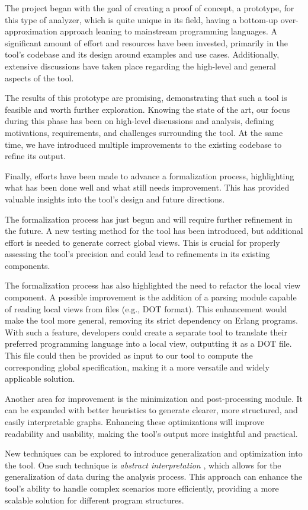 The project began with the goal of creating a proof of concept, a prototype,  
for this type of analyzer, which is quite unique in its field,
having a bottom-up over-approximation approach leaning to mainstream
programming languages.  
A significant amount of effort and resources have been invested,  
primarily in the tool's codebase and its design around examples and  
use cases. Additionally, extensive discussions have taken place  
regarding the high-level and general aspects of the tool.  

The results of this prototype are promising, demonstrating that such  
a tool is feasible and worth further exploration.  
Knowing the state of the art, our focus during this phase has been on  
high-level discussions and analysis, defining motivations,  
requirements, and challenges surrounding the tool. At the same time,  
we have introduced multiple improvements to the existing codebase to  
refine its output.  

Finally, efforts have been made to advance a formalization process,  
highlighting what has been done well and what still needs  
improvement. This has provided valuable insights into the tool’s  
design and future directions.  

The formalization process has just begun and will require further refinement  
in the future. A new testing method for the tool has been introduced, but  
additional effort is needed to generate correct global views. This is  
crucial for properly assessing the tool's precision and could lead to  
refinements in its existing components.  

The formalization process has also highlighted the need to refactor the  
local view component. A possible improvement is the addition of a parsing  
module capable of reading local views from files (e.g., DOT format).  
This enhancement would make the tool more general, removing its strict  
dependency on Erlang programs. 
With such a feature, developers could create a separate tool to translate  
their preferred programming language into a local view, outputting it  
as a DOT file. This file could then be provided as input to our tool  
to compute the corresponding global specification, making it a more  
versatile and widely applicable solution.  

Another area for improvement is the minimization and post-processing  
module. It can be expanded with better heuristics to generate clearer,  
more structured, and easily interpretable graphs. Enhancing these  
optimizations will improve readability and usability, making the tool’s  
output more insightful and practical.

New techniques can be explored to introduce generalization and optimization  
into the tool. One such technique is \textit{abstract interpretation}  
\cite{cousot1977abstract}, which allows for the generalization of data  
during the analysis process. This approach can enhance the tool’s  
ability to handle complex scenarios more efficiently, providing  
a more scalable solution for different program structures.  
